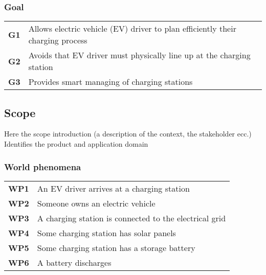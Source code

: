 \subsubsection*{Goal}
\begin{table}[H]
    \begin{tabularx}{\textwidth}{cX}
        \toprule
        \textbf{G1} & Allows electric vehicle (EV) driver to plan efficiently their charging process \\
        \textbf{G2} & Avoids that EV driver must physically line up at the charging station          \\
        \textbf{G3} & Provides smart managing of charging stations                                   \\ \bottomrule
    \end{tabularx}
\end{table}

\subsection{Scope}
Here the scope introduction (a description of the context, the stakeholder ecc.)
Identifies the product and application domain
\subsubsection*{World phenomena}
\begin{table}[H]
    \begin{tabularx}{\textwidth}{cX}
        \toprule
        \textbf{WP1} & An EV driver arrives at a charging station             \\
        \textbf{WP2} & Someone owns an electric vehicle                       \\
        \textbf{WP3} & A charging station is connected to the electrical grid \\
        \textbf{WP4} & Some charging station has solar panels                 \\
        \textbf{WP5} & Some charging station has a storage battery            \\
        \textbf{WP6} & A battery discharges                                   \\ \bottomrule
    \end{tabularx}
\end{table}

